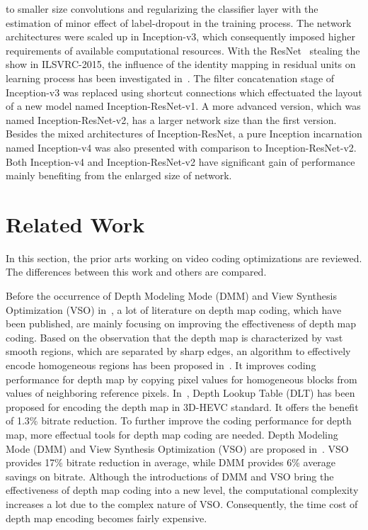 to smaller size convolutions and regularizing the classifier layer with
the estimation of minor effect of label-dropout in the training process.
The network architectures were scaled up in Inception-v3, which consequently
imposed higher requirements of available computational resources.
With the ResNet~\parencite{RN67} stealing the show in ILSVRC-2015,
the influence of the
identity mapping in residual units on learning process
has been investigated in~\parencite{RN63}.
The filter concatenation stage of Inception-v3 was replaced using shortcut
connections which effectuated the layout of a new model 
named Inception-ResNet-v1.
A more advanced version, which was named Inception-ResNet-v2, has a larger
network size than the first version.
Besides the mixed architectures of Inception-ResNet, a pure Inception
incarnation named Inception-v4 was also presented with comparison to
Inception-ResNet-v2.
Both Inception-v4 and Inception-ResNet-v2 have significant gain of performance
mainly benefiting from the enlarged size of network.

\section{Related Work}\label{sec:related-work}
In this section, the prior arts working on video
coding optimizations are reviewed.
The differences between this work and others
are compared.

Before the occurrence of Depth Modeling Mode (DMM) and
View Synthesis Optimization (VSO) in~\parencite{RN208}, a lot of literature
on depth map coding, which have been published, are mainly
focusing on improving the effectiveness of depth map coding.
Based on the observation that the depth map is characterized by vast
smooth regions, which are separated by sharp edges, 
an algorithm to effectively
encode homogeneous regions has been proposed in~\parencite{RN120}.
It improves coding performance for depth map by copying pixel values for
homogeneous blocks from values of neighboring reference pixels.
In~\parencite{RN123}, Depth Lookup Table (DLT) has been proposed for
encoding the depth map in 3D-HEVC standard.
It offers the benefit of 1.3\% bitrate reduction.
To further improve the coding performance for depth map, more
effectual tools for depth map coding are needed.
Depth Modeling Mode (DMM) and View Synthesis Optimization (VSO) are proposed
in~\parencite{RN208}.
VSO provides 17\% bitrate reduction in average, while DMM provides 6\% 
average savings on bitrate.
Although the introductions of DMM and VSO bring the effectiveness of
depth map coding into a new level, the computational complexity increases
a lot due to the complex nature of VSO\@.
Consequently, the time cost of depth map encoding becomes fairly expensive.

